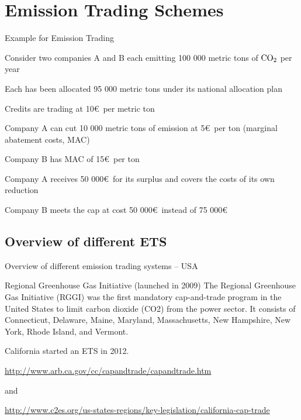 \section{Emission Trading Schemes}

{Example for Emission Trading}






	Consider two companies A and B each emitting 100 000 metric tons of $\textnormal{CO}_2$ per year


	Each has been allocated 95 000 metric tons under its national allocation plan


	Credits are trading at 10\euro\ per metric ton


	Company A can cut 10 000 metric tons of emission at 5\euro\ per ton (marginal abatement costs, MAC)


	Company B has MAC of 15\euro\ per ton


	Company A receives 50 000\euro\ for its surplus and covers the costs of its own reduction


	Company B meets the cap at cost 50 000\euro\ instead of 75 000\euro






\subsection[Overview]{Overview of different ETS}

{Overview of different emission trading systems  -- USA}


	
  Regional Greenhouse Gas Initiative (launched in 2009)
        The Regional Greenhouse Gas Initiative (RGGI) was the first mandatory cap-and-trade program in the United States to limit carbon dioxide (CO2) from the power sector. It consists of Connecticut, Delaware, Maine, Maryland, Massachusetts, New Hampshire, New York, Rhode Island, and Vermont.


	
   California started an ETS in 2012.

   \url{http://www.arb.ca.gov/cc/capandtrade/capandtrade.htm}

  and

  \url{http://www.c2es.org/us-states-regions/key-legislation/california-cap-trade}


